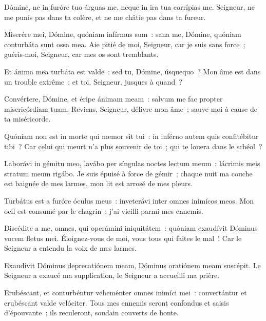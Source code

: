 \Gloria
{}
\begin{paracol}{2}

\LigneParacol{0cm}
{Dómine, ne in furóre tuo árguas me, \GreStar{} neque in ira tua corrípias me.}
{Seigneur, ne me punis pas dans ta colère, et ne me châtie pas dans ta fureur. }

\LigneParacol{0.2cm}
{Miserére mei, Dómine, quóniam infírmus sum~: \GreStar{} sana me, Dómine, quóniam conturbáta sunt ossa mea.}
{Aie pitié de moi, Seigneur, car je suis sans force~; guéris-moi, Seigneur, car mes os sont tremblants. }

\LigneParacol{0.2cm}
{Et ánima mea turbáta est valde~: \GreStar{} sed tu, Dómine, úsquequo~?}
{Mon âme est dans un trouble extrême~; et toi, Seigneur, jusques à quand~? }

\LigneParacol{0.2cm}
{Convértere, Dómine, et éripe ánimam meam~: \GreStar{} salvum me fac propter misericórdiam tuam.}
{Reviens, Seigneur, délivre mon âme~; sauve-moi à cause de ta miséricorde. }

\LigneParacol{0.2cm}
{Quóniam non est in morte qui memor sit tui~: \GreStar{} in inférno autem quis confitébitur tibi~?}
{Car celui qui meurt n'a plus souvenir de toi~; qui te louera dans le schéol~? }

\LigneParacol{0.2cm}
{Laborávi in gémitu meo, lavábo per síngulas noctes lectum meum~: \GreStar{} lácrimis meis stratum meum rigábo.}
{Je suis épuisé à force de gémir~; chaque nuit ma couche est baignée de mes larmes, mon lit est arrosé de mes pleurs. }

\LigneParacol{0.2cm}
{Turbátus est a furóre óculus meus~: \GreStar{} inveterávi inter omnes inimícos meos.}
{Mon oeil est consumé par le chagrin~; j'ai vieilli parmi mes ennemis. }

\LigneParacol{0.2cm}
{Discédite a me, omnes, qui operámini iniquitátem~: \GreStar{} quóniam exaudívit Dóminus vocem fletus mei.}
{Éloignez-vous de moi, vous tous qui faites le mal~! Car le Seigneur a entendu la voix de mes larmes. }

\LigneParacol{0.2cm}
{Exaudívit Dóminus deprecatiónem meam, \GreStar{} Dóminus oratiónem meam suscépit.}
{Le Seigneur a exaucé ma supplication, le Seigneur a accueilli ma prière. }

\LigneParacol{0.2cm}
{Erubéscant, et conturbéntur veheménter omnes inimíci mei~: \GreStar{} convertántur et erubéscant valde velóciter.}
{Tous mes ennemis seront confondus et saisis d'épouvante~; ils reculeront, soudain couverts de honte.  }

\end{paracol}
